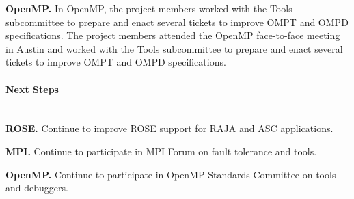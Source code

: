 \textbf{OpenMP.} In OpenMP, the project members worked with the Tools 
subcommittee to prepare and enact several tickets to improve OMPT 
and OMPD specifications.  The project members attended the OpenMP 
face-to-face meeting in Austin and worked with the Tools subcommittee 
to prepare and enact several tickets to improve OMPT and OMPD 
specifications.


\paragraph{Next Steps}  \leavevmode \\


\textbf{ROSE.} Continue to improve ROSE support for RAJA and ASC applications.

\textbf{MPI.} Continue to participate in MPI Forum on fault tolerance and
tools.

\textbf{OpenMP.} Continue to participate in OpenMP Standards Committee
on tools and debuggers.
